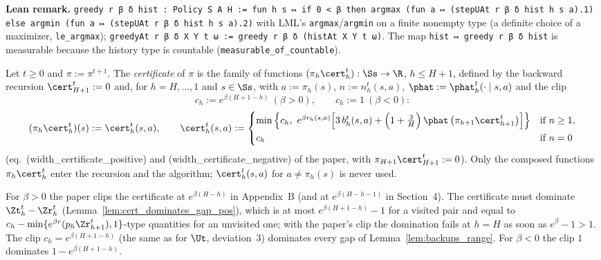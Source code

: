 \textbf{Lean remark.} \texttt{greedy r β δ hist : Policy S A H := fun h s ↦ if 0 < β then argmax (fun a ↦ (stepUAt r β δ hist h s a).1) else argmin (fun a ↦ (stepUAt r β δ hist h s a).2)}
with LML's \texttt{argmax}/\texttt{argmin} on a finite nonempty type (a definite choice of a
maximizer, \texttt{le\_argmax}); \texttt{greedyAt r β δ X Y t ω := greedy r β δ (histAt X Y t ω)}.
The map \texttt{hist ↦ greedy r β δ hist} is measurable because the history type is countable
(\texttt{measurable\_of\_countable}).

\begin{definition}[Certificate]\label{def:certificate}
\leanok
{}
Let $t \ge 0$ and $\pi := \pi^{t+1}$. The \emph{certificate} of $\pi$ is the family of functions
$(\pi_h \cert^t_h) : \Ss \to \R$, $h \le H + 1$, defined by the backward recursion
$\cert^t_{H+1} := 0$ and, for $h = H, \dots, 1$ and $s \in \Ss$, with $a := \pi_h(s)$,
$n := n_h^t(s, a)$, $\phat := \phat_h^t(\cdot \mid s, a)$ and the clip
\[
  c_h := e^{\beta(H + 1 - h)} \ (\beta > 0), \qquad c_h := 1 \ (\beta < 0):
\]
\[
  (\pi_h \cert^t_h)(s) := \cert^t_h(s, a),
  \qquad
  \cert^t_h(s, a) :=
  \begin{cases}
    \min\Big\{ c_h,\ e^{\beta r_h(s, a)} \Big[ 3\, b_h^t(s, a) + \Big(1 + \frac3H\Big)\, \phat\,\big(\pi_{h+1}\cert^t_{h+1}\big) \Big] \Big\} & \text{if } n \ge 1, \\[4pt]
    c_h & \text{if } n = 0
  \end{cases}
\]
(eq.~(width\_certificate\_positive) and (width\_certificate\_negative) of the paper, with
$\pi_{H+1}\cert^t_{H+1} := 0$). Only the composed functions $\pi_h \cert^t_h$ enter the
recursion and the algorithm; $\cert^t_h(s, a)$ for $a \ne \pi_h(s)$ is never used.
\end{definition}

\begin{remark}\label{rem:algorithm_cert_clip}
For $\beta > 0$ the paper clips the certificate at $e^{\beta(H - h)}$ in Appendix~B (and at
$e^{\beta(H - h - 1)}$ in Section~4). The certificate must dominate $\Zt^t_h - \Zr^t_h$
(Lemma~\ref{lem:cert_dominates_gap_pos}), which is at most $e^{\beta(H + 1 - h)} - 1$ for a visited
pair and equal to $c_h - \min\{e^{\beta r}(p_h \Zr^t_{h+1}), 1\}$-type quantities for an unvisited
one; with the paper's clip the domination fails at $h = H$ as soon as $e^{\beta} - 1 > 1$. The
clip $c_h = e^{\beta(H + 1 - h)}$ (the same as for $\Ut$, deviation~3) dominates every gap of
Lemma~\ref{lem:backups_range}. For $\beta < 0$ the clip $1$ dominates $1 - e^{\beta(H + 1 - h)}$.
\end{remark}

